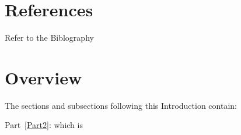 
\section{References}

Refer to the Biblography


\section{Overview}

The sections and subsections following this Introduction contain:

Part~\ref{Part2}:  which is 
